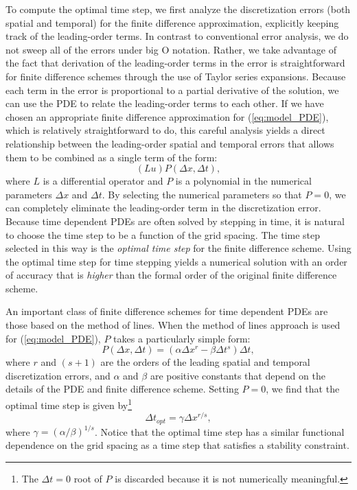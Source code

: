 \documentclass[fleqn,12pt,twoside]{article}
\newcommand{\beq}{\begin{equation}}
\newcommand{\eeq}{\end{equation}}
\def\dt{\Delta t}
\def\dx{\Delta x}
\def\dto{\dt_{opt}}
\begin{document}
To compute the optimal time step, we first analyze the discretization errors 
(both spatial and temporal) for the finite difference approximation, 
explicitly keeping track of the leading-order terms.  In contrast to 
conventional error analysis, we do not sweep all of the errors under big O
notation.  Rather, we take advantage of the fact that derivation of the 
leading-order terms in the error is straightforward for finite difference
schemes through the use of Taylor series expansions.  Because each term in 
the error is proportional to a partial derivative of the solution, we can 
use the PDE to relate the leading-order terms to each other.  
If we have chosen an appropriate finite difference approximation for 
(\ref{eq:model_PDE}), which is relatively straightforward to do, this careful 
analysis yields a direct relationship between the leading-order spatial and 
temporal errors that allows them to be combined as a single term of the form:
\beq
  (L u) P(\dx, \dt) ,
  \label{eq:leading_order_error_model_PDE_general}
\eeq
where $L$ is a differential operator and $P$ is a polynomial in the numerical 
parameters $\dx$ and $\dt$.  By selecting the numerical parameters so that 
$P = 0$, we can completely eliminate the leading-order term in the 
discretization error.  Because time dependent PDEs are often solved by 
stepping in time, it is natural to choose the time step to be a function of 
the grid spacing.  The time step selected in this way is the
\emph{optimal time step} for the finite difference scheme.  Using the optimal
time step for time stepping yields a numerical solution with an order 
of accuracy that is \emph{higher} than the formal order of the original finite 
difference scheme.

An important class of finite difference schemes for time dependent PDEs are 
those based on the method of lines.   When the method of lines approach is 
used for (\ref{eq:model_PDE}), $P$ takes a particularly simple 
form:
\beq
  P(\dx, \dt) = (\alpha \dx^r - \beta \dt^s) \dt,
  \label{eq:leading_order_error_model_PDE_MOL}
\eeq
where $r$ and $(s+1)$ are the orders of the leading spatial and temporal 
discretization errors, and $\alpha$ and $\beta$ are positive constants that 
depend on the details of the PDE and finite difference scheme.  Setting 
$P = 0$, we find that the optimal time step is given by\footnote{The $\dt = 0$ 
root of $P$ is discarded because it is not numerically meaningful.}
\beq
  \dto = \gamma \dx^{r/s},
  \label{eq:optimal_time_step}
\eeq
where $\gamma = (\alpha/\beta)^{1/s}$.  Notice that the optimal time step 
has a similar functional dependence on the grid spacing as a time step that 
satisfies a stability constraint.  
\end{document}
